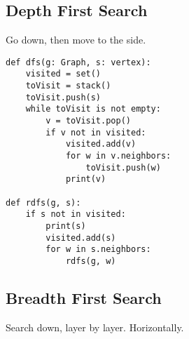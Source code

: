 \documentclass{article}
\begin{document}
\subsection{Depth First Search}
\label{sec:orgd260f9e}
Go down, then move to the side.
\begin{verbatim}
def dfs(g: Graph, s: vertex):
    visited = set()
    toVisit = stack()
    toVisit.push(s)
    while toVisit is not empty:
        v = toVisit.pop()
        if v not in visited:
            visited.add(v)
            for w in v.neighbors:
                toVisit.push(w)
            print(v)

def rdfs(g, s):
    if s not in visited:
        print(s)
        visited.add(s)
        for w in s.neighbors:
            rdfs(g, w)
\end{verbatim}

\subsection{Breadth First Search}
\label{sec:org311d874}
Search down, layer by layer. Horizontally.
\end{document}
